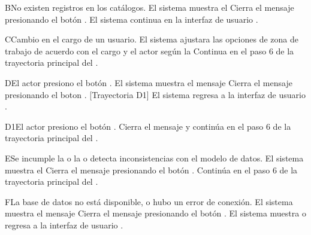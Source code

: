 \begin{UCtrayectoriaA}{B}{No existen registros en los catálogos.}
	\UCpaso     El sistema muestra el 
	\UCpaso[\UCactor] Cierra el mensaje presionando el botón .
	\UCpaso El sistema continua en la interfaz de usuario .
\end{UCtrayectoriaA}

\begin{UCtrayectoriaA}{C}{Cambio en el cargo de un usuario.}
	\UCpaso     El sistema ajustara las opciones de zona de trabajo de acuerdo con el cargo y el actor según la 
	\UCpaso     Continua en el paso 6 de la trayectoria principal del .
\end{UCtrayectoriaA}


\begin{UCtrayectoriaA}{D}{El actor presiono el botón .}
	\UCpaso El sistema muestra el mensaje 
	\UCpaso[\UCactor] Cierra el mensaje presionando el boton . [Trayectoria D1]
	\UCpaso El sistema regresa a la interfaz de usuario .
\end{UCtrayectoriaA}

	\begin{UCtrayectoriaA}{D1}{El actor presiono el botón .}
	\UCpaso Cierra el mensaje y continúa en el paso 6 de la trayectoria principal del .	
\end{UCtrayectoriaA}

\begin{UCtrayectoriaA}{E}{Se incumple la  o la   o detecta inconsistencias con el modelo de datos.}
	\UCpaso El sistema muestra el 
	\UCpaso[\UCactor] Cierra el mensaje presionando el botón .
	\UCpaso Continúa en el paso 6 de la trayectoria principal del .
\end{UCtrayectoriaA}


\begin{UCtrayectoriaA}{F}{La base de datos no está disponible, o hubo un error de conexión.}
	\UCpaso El sistema muestra el mensaje 
	\UCpaso[\UCactor] Cierra el mensaje presionando el botón .
	\UCpaso El sistema muestra o regresa a la interfaz de usuario  .
\end{UCtrayectoriaA}


